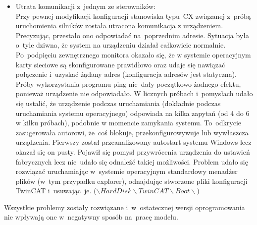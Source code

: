 \begin{itemize}
\item Utrata komunikacji z~jednym ze sterowników:\\[1mm]
Przy pewnej modyfikacji konfiguracji stanowiska typu~CX związanej z~próbą uruchomienia silników została utracona komunikacja z urządzeniem. Precyzując, przestało ono odpowiadać na~poprzednim adresie. Sytuacja była o~tyle dziwna, że system na urządzeniu działał całkowicie normalnie. Po~podpięciu zewnętrznego monitora okazało się, że w systemie operacyjnym karty sieciowe są skonfigurowane prawidłowo oraz udaje się nawiązać połączenie i~uzyskać żądany adres (konfiguracja adresów jest statyczna). Próby wykorzystania programu ping nie~dały początkowo żadnego efektu, ponieważ urządzenie nie odpowiadało. W licznych próbach i~pomysłach udało się ustalić, że urządzenie podczas uruchamiania (dokładnie podczas uruchamiania systemu operacyjnego) odpowiada na kilka zapytań (od 4 do 6 w kilku próbach), podobnie w momencie zamykania systemu. To~odkrycie zasugerowała autorowi, że~coś blokuje, przekonfigurowywuje lub wywłaszcza urządzenia. Pierwszy został przeanalizowany autostart systemu Windows lecz okazał się on pusty. Pojawił się pomysł przywrócenia urządzenia do ustawień fabrycznych lecz nie~udało się odnaleźć takiej możliwości. Problem udało się rozwiązać uruchamiając w~systemie operacyjnym standardowy menadżer plików (w~tym przypadku explorer), odnajdując stworzone pliki konfiguracji TwinCAT i~usuwając~je. ($\backslash Hard Disk\backslash TwinCAT\backslash Boot\backslash$)

\end{itemize}
\indent
\indent Wszystkie problemy zostały rozwiązane i~w~ostatecznej wersji oprogramowania nie wpływają one w~negatywny sposób na~pracę modelu.
